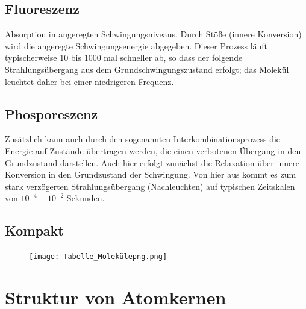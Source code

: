 \documentclass[twocolumn]{summery_4.1}
\begin{document}
\subsection{Fluoreszenz}
Absorption in angeregten Schwingungsniveaus. Durch Stöße (innere Konversion) wird die angeregte Schwingungsenergie abgegeben. Dieser Prozess läuft typischerweise 10 bis 1000 mal schneller ab, so dass der folgende Strahlungsübergang aus dem Grundschwingungszustand erfolgt; das Molekül leuchtet daher bei einer niedrigeren Frequenz.

\subsection{Phosporeszenz}
Zusätzlich kann auch durch den sogenannten Interkombinationsprozess die Energie
auf Zustände übertragen werden, die einen verbotenen Übergang in den Grundzustand darstellen. Auch hier erfolgt zunächst die Relaxation über innere Konversion in den Grundzustand der Schwingung. Von
hier aus kommt es zum stark verzögerten Strahlungsübergang (Nachleuchten) auf typischen Zeitskalen von $10^{-4} - 10^{-2}$ Sekunden.

\subsection{Kompakt}
\begin{figure}[H]
    \centering
    \texttt{[image: Tabelle\_Molekülepng.png]}
\end{figure}

\section{Struktur von Atomkernen}
\end{document}
